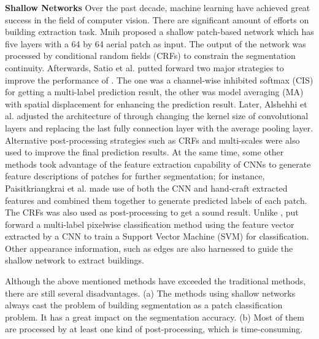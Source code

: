 \textbf{Shallow Networks} Over the past decade, machine learning have achieved great success in the field of computer vision.
There are significant amount of efforts on building extraction task.
Mnih \cite{IEEEexample:mnih2013machine} proposed a shallow patch-based network which has five layers with a 64 by 64 aerial patch as input.
The output of the network was processed by conditional random fields (CRFs) to constrain the segmentation continuity.
Afterwards, Satio et al. \cite{IEEEexample:saito2016multiple} putted forward two major strategies to improve the performance of \cite{IEEEexample:mnih2013machine}.
The one was a channel-wise inhibited softmax (CIS) for getting a multi-label prediction result, the other was model averaging (MA) with spatial displacement for enhancing the prediction result.
Later, Alshehhi et al. \cite{IEEEexample:alshehhi2017simultaneous} adjusted the architecture of \cite{IEEEexample:mnih2013machine} through changing the kernel size of convolutional layers and replacing the last fully connection layer with the average pooling layer.
Alternative post-processing strategies such as CRFs and multi-scales were also used to improve the final prediction results.
At the same time, some other methods took advantage of the feature extraction capability of CNNs to generate feature descriptions of patches for further segmentation; for instance,
Paisitkriangkrai et al. \cite{IEEEexample:paisitkriangkrai2015effective} made use of both the CNN and hand-craft extracted features and combined them together to generate predicted labels of each patch.
The CRFs was also used as post-processing to get a sound result.
Unlike \cite{IEEEexample:paisitkriangkrai2015effective}, \cite{IEEEexample:he2017multi} put forward a multi-label pixelwise classification method using the feature vector extracted by a CNN to train a Support Vector Machine (SVM) for classification.
Other appearance information, such as edges \cite{IEEEexample:zhao2017contextually} are also harnessed to guide the shallow network to extract buildings.


Although the above mentioned methods have exceeded the traditional methods, there are still several disadvantages. 
(a) The methods using shallow networks always cast the problem of building segmentation as a patch classification problem. It has a great impact on the segmentation accuracy.
(b) Most of them are processed by at least one kind of post-processing, which is time-consuming.

